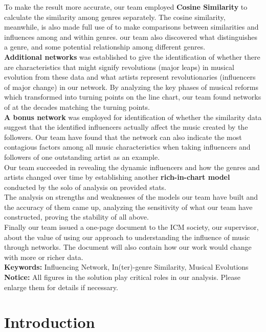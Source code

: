 \documentclass[12pt]{article}
\begin{document}
To make the result more accurate, our team employed {\textbf{Cosine Similarity}} to calculate the similarity among genres separately. The cosine similarity, meanwhile, is also made full use of to make comparisons between similarities and influences among and within genres. our team also discovered what distinguishes a genre, and some potential relationship among different genres.\\[2ex]
\textbf{Additional networks} was established to give the identification of whether there are characteristics that might signify revolutions (major leaps) in musical evolution from these data and what artists represent revolutionaries (influencers of major change) in our network. By analyzing the key phases of musical reforms which transformed into turning points on the line chart, our team found networks of at the decades matching the turning points.\\[2ex]
\textbf{A bonus network} was employed for identification of whether the similarity data suggest that the identified influencers actually affect the music created by the followers. Our team have found that the network can also indicate the most contagious factors among all music characteristics when taking influencers and followers of one outstanding artist as an example.\\[2ex]
Our team succeeded in revealing the dynamic influencers and how the genres and artists changed over time by establishing another {\textbf{rich-in-chart model}} conducted by the solo of analysis on provided stats.\\[2ex]
The analysis on strengths and weaknesses of the models our team have built and the accuracy of them came up, analyzing the sensitivity of what our team have constructed, proving the stability of all above.\\[2ex]
Finally our team issued a one-page document to the ICM society, our supervisor, about the value of using our approach to understanding the influence of music through networks. The document will also contain how our work would change with more or richer data.\\[2ex]
\textbf{Keywords:} Influencing Network, In(ter)-genre Similarity, Musical Evolutions
\clearpage
\pagestyle{fancy}
\newpage
\setcounter{page}{1}
\tableofcontents
{\textbf{}}\\[2ex]
{\textbf{Notice:} All figures in the solution play critical roles in our analysis. Please enlarge them for details if necessary.}
\clearpage
\section{Introduction}
\end{document}

